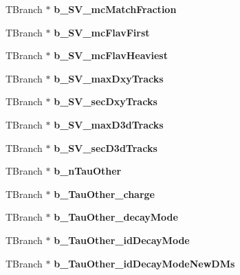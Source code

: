 \begin{DoxyCompactItemize}
T\+Branch $\ast$ {\bfseries b\+\_\+\+S\+V\+\_\+mc\+Match\+Fraction}
\item 
\hypertarget{classMiniTree_afae4e05a2a5b31598d1d7c5425d69105}{}\label{classMiniTree_afae4e05a2a5b31598d1d7c5425d69105} 
T\+Branch $\ast$ {\bfseries b\+\_\+\+S\+V\+\_\+mc\+Flav\+First}
\item 
\hypertarget{classMiniTree_adf3bcb40d20215ccd022ee4b6955264e}{}\label{classMiniTree_adf3bcb40d20215ccd022ee4b6955264e} 
T\+Branch $\ast$ {\bfseries b\+\_\+\+S\+V\+\_\+mc\+Flav\+Heaviest}
\item 
\hypertarget{classMiniTree_a28ac16cbe5bd529e9f52fdda72190aa2}{}\label{classMiniTree_a28ac16cbe5bd529e9f52fdda72190aa2} 
T\+Branch $\ast$ {\bfseries b\+\_\+\+S\+V\+\_\+max\+Dxy\+Tracks}
\item 
\hypertarget{classMiniTree_a7ff2707b051017cb81b5915bd659fdf8}{}\label{classMiniTree_a7ff2707b051017cb81b5915bd659fdf8} 
T\+Branch $\ast$ {\bfseries b\+\_\+\+S\+V\+\_\+sec\+Dxy\+Tracks}
\item 
\hypertarget{classMiniTree_a08051ac586018699c56b567482622c47}{}\label{classMiniTree_a08051ac586018699c56b567482622c47} 
T\+Branch $\ast$ {\bfseries b\+\_\+\+S\+V\+\_\+max\+D3d\+Tracks}
\item 
\hypertarget{classMiniTree_abec14675bd2a392a971168a2fdf87833}{}\label{classMiniTree_abec14675bd2a392a971168a2fdf87833} 
T\+Branch $\ast$ {\bfseries b\+\_\+\+S\+V\+\_\+sec\+D3d\+Tracks}
\item 
\hypertarget{classMiniTree_ad31963a812c8e65a3390676fc7b9843c}{}\label{classMiniTree_ad31963a812c8e65a3390676fc7b9843c} 
T\+Branch $\ast$ {\bfseries b\+\_\+n\+Tau\+Other}
\item 
\hypertarget{classMiniTree_a7b0b95fae836f3fac1e74e1e9dd9adf4}{}\label{classMiniTree_a7b0b95fae836f3fac1e74e1e9dd9adf4} 
T\+Branch $\ast$ {\bfseries b\+\_\+\+Tau\+Other\+\_\+charge}
\item 
\hypertarget{classMiniTree_ae764d8891d0d189e17405456dd30acbc}{}\label{classMiniTree_ae764d8891d0d189e17405456dd30acbc} 
T\+Branch $\ast$ {\bfseries b\+\_\+\+Tau\+Other\+\_\+decay\+Mode}
\item 
\hypertarget{classMiniTree_a91dc49b36277e1c71056d05529870da8}{}\label{classMiniTree_a91dc49b36277e1c71056d05529870da8} 
T\+Branch $\ast$ {\bfseries b\+\_\+\+Tau\+Other\+\_\+id\+Decay\+Mode}
\item 
\hypertarget{classMiniTree_a7e33e944cbaa39adf3ee19b845ed3e26}{}\label{classMiniTree_a7e33e944cbaa39adf3ee19b845ed3e26} 
T\+Branch $\ast$ {\bfseries b\+\_\+\+Tau\+Other\+\_\+id\+Decay\+Mode\+New\+D\+Ms}

\end{DoxyCompactItemize}
